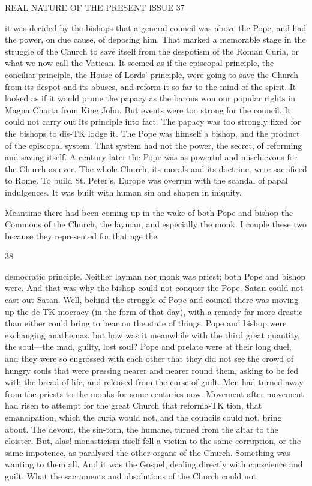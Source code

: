 \documentclass[12pt,a5paper,oneside]{book}
\begin{document}
REAL NATURE OF THE PRESENT ISSUE 37 

it was decided by the bishops that a general council 
was above the Pope, and had the power, on due cause, 
of deposing him. That marked a memorable stage in 
the struggle of the Church to save itself from the 
despotism of the Roman Curia, or what we now call 
the Vatican. It seemed as if the episcopal principle, 
the conciliar principle, the House of Lords' principle, 
were going to save the Church from its despot and its 
abuses, and reform it so far to the mind of the spirit. 
It looked as if it would prune the papacy as the barons 
won our popular rights in Magna Charta from King 
John. But events were too strong for the council. 
It could not carry out its principle into fact. The 
papacy was too strongly fixed for the bishops to dis-TK
lodge it. The Pope was himself a bishop, and the 
product of the episcopal system. That system had 
not the power, the secret, of reforming and saving 
itself. A century later the Pope was as powerful 
and mischievous for the Church as ever. The whole 
Church, its morals and its doctrine, were sacrificed to 
Rome. To build St. Peter's, Europe was overrun 
with the scandal of papal indulgences. It was built 
with human sin and shapen in iniquity. 

Meantime there had been coming up in the wake 
of both Pope and bishop the Commons of the Church, 
the layman, and especially the monk. I couple 
these two because they represented for that age the 



38 

democratic principle. Neither layman nor monk was 
priest; both Pope and bishop were. And that was 
why the bishop could not conquer the Pope. Satan 
could not cast out Satan. Well, behind the struggle 
of Pope and council there was moving up the de-TK
mocracy (in the form of that day), with a remedy far 
more drastic than either could bring to bear on the 
state of things. Pope and bishop were exchanging 
anathemas, but how was it meanwhile with the third 
great quantity, the soul---the mad, guilty, lost soul? 
Pope and prelate were at their long duel, and they 
were so engrossed with each other that they did not 
see the crowd of hungry souls that were pressing nearer 
and nearer round them, asking to be fed with the bread 
of life, and released from the curse of guilt. Men 
had turned away from the priests to the monks for 
some centuries now. Movement after movement had 
risen to attempt for the great Church that reforma-TK
tion, that emancipation, which the curia would not, 
and the councils could not, bring about. The devout, 
the sin-torn, the humane, turned from the altar to 
the cloister. But, alas! monasticism itself fell a victim 
to the same corruption, or the same impotence, as 
paralysed the other organs of the Church. Something 
was wanting to them all. And it was the Gospel, 
dealing directly with conscience and guilt. What the 
sacraments and absolutions of the Church could not 
\end{document}
